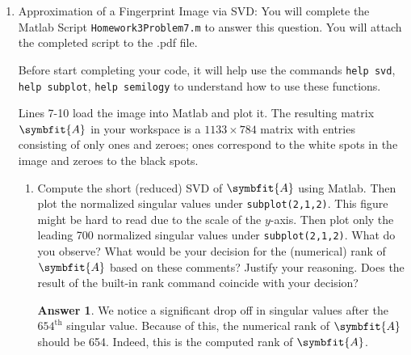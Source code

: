 \documentclass{article}
\theoremstyle{definition}
\newtheorem*{answer}{Answer}
\newcommand{\mat}[1]{\symbfit{#1}}
\begin{document}
\begin{enumerate}[leftmargin=\labelsep]
\begin{proof}
	      \end{proof}

	\item Approximation of a Fingerprint Image via SVD: You will complete the Matlab Script \texttt{Homework3Problem7.m} to answer this question. You will attach the completed script to the .pdf file.

	      Before start completing your code, it will help use the commands \texttt{help svd}, \texttt{help subplot}, \texttt{help semilogy} to understand how to use these functions.

	      Lines 7-10 load the image into Matlab and plot it. The resulting matrix \(\mat{A}\) in your workspace is a \(1133 \times 784\) matrix with entries consisting of only ones and zeroes; ones correspond to the white spots in the image and zeroes to the black spots.
	      \begin{enumerate}
		      \item Compute the short (reduced) SVD of \(\mat{A}\) using Matlab. Then plot the normalized singular values under \texttt{subplot(2,1,2)}. This figure might be hard to read due to the scale of the \(y\)-axis. Then plot only the leading 700 normalized singular values under \texttt{subplot(2,1,2)}. What do you observe? What would be your decision for the (numerical) rank of \(\mat{A}\) based on these comments? Justify your reasoning. Does the result of the built-in rank command coincide with your decision?
		            \begin{answer}
						We notice a significant drop off in singular values after the \(654^\text{th}\) singular value. Because of this, the numerical rank of \(\mat{A}\) should be 654. Indeed, this is the computed rank of \(\mat{A}\).
			            \begin{figure} %
				            \centering{}
\end{figure}
\end{answer}
\end{enumerate}
\end{enumerate}
\end{document}
